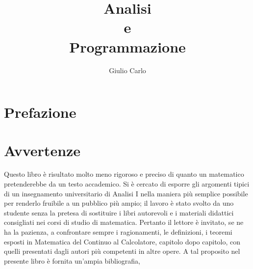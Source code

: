 \documentclass[12pt,a4paper,titlepage]{book}
\author{Giulio Carlo}
\date{}
\title{\huge{\textbf{Analisi}} \\
\vspace{0.5cm}
\textbf{e} \\
\vspace{0.5cm}
\huge{\textbf{Programmazione}}}
\numberwithin{theorem}{section}
\theoremstyle{numparens}
\theoremstyle{break}
\begin{document}
\maketitle
\frontmatter
\section*{Prefazione}
\newpage
\section*{Avvertenze}
Questo libro è risultato molto meno rigoroso e preciso di quanto un matematico pretenderebbe da un testo accademico. Si è cercato di esporre gli argomenti tipici di un insegnamento universitario di Analisi I nella maniera più semplice possibile per renderlo fruibile a un pubblico più ampio; il lavoro è stato svolto da uno studente senza la pretesa di sostituire i libri autorevoli e i materiali didattici consigliati nei corsi di studio di matematica. Pertanto il lettore è invitato, se ne ha la pazienza, a confrontare sempre i ragionamenti, le definizioni, i teoremi esposti in Matematica del Continuo al Calcolatore, capitolo dopo capitolo, con quelli presentati dagli autori più competenti in altre opere. A tal proposito nel presente libro è fornita un'ampia bibliografia,
\newpage
\setcounter{tocdepth}{1}
\tableofcontents
\mainmatter


\appendix


\printbibliography[heading=bibintoc]
\end{document}
